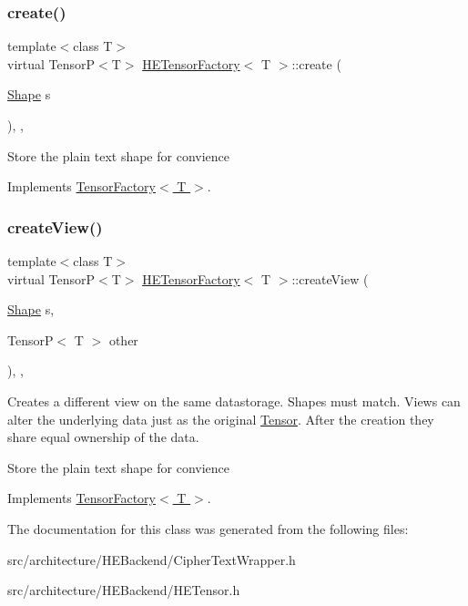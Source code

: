 \subsubsection{\texorpdfstring{create()}{create()}}
{\footnotesize\ttfamily template$<$class T$>$ \\
virtual TensorP$<$T$>$ \hyperlink{classHETensorFactory}{H\+E\+Tensor\+Factory}$<$ T $>$\+::create (\begin{DoxyParamCaption}\item[{\hyperlink{classShape}{Shape}}]{s }\end{DoxyParamCaption})\hspace{0.3cm}{\ttfamily [inline]}, {\ttfamily [override]}, {\ttfamily [virtual]}}

Store the plain text shape for convience 

Implements \hyperlink{classTensorFactory}{Tensor\+Factory$<$ T $>$}.

\mbox{\label{classHETensorFactory_a9c8d6f82f1cbbdf497eb784b0c417f03}} 
\subsubsection{\texorpdfstring{create\+View()}{createView()}}
{\footnotesize\ttfamily template$<$class T$>$ \\
virtual TensorP$<$T$>$ \hyperlink{classHETensorFactory}{H\+E\+Tensor\+Factory}$<$ T $>$\+::create\+View (\begin{DoxyParamCaption}\item[{\hyperlink{classShape}{Shape}}]{s,  }\item[{TensorP$<$ T $>$}]{other }\end{DoxyParamCaption})\hspace{0.3cm}{\ttfamily [inline]}, {\ttfamily [override]}, {\ttfamily [virtual]}}



Creates a different view on the same datastorage. Shapes must match. Views can alter the underlying data just as the original \hyperlink{classTensor}{Tensor}. After the creation they share equal ownership of the data. 

Store the plain text shape for convience 

Implements \hyperlink{classTensorFactory_ad14cbf4066594cc77f2fb75ee0a6ca74}{Tensor\+Factory$<$ T $>$}.



The documentation for this class was generated from the following files\+:\begin{DoxyCompactItemize}
\item 
src/architecture/\+H\+E\+Backend/Cipher\+Text\+Wrapper.\+h\item 
src/architecture/\+H\+E\+Backend/H\+E\+Tensor.\+h\end{DoxyCompactItemize}
